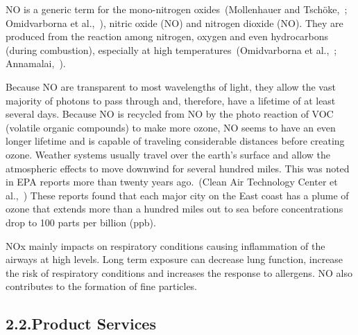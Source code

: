 \documentclass[9pt]{article}
\begin{document}
\noindent{}NO is a generic term for the mono-nitrogen oxides~(Mollenhauer and Tschöke,~; Omidvarborna et al.,~), nitric oxide (NO) and nitrogen dioxide (NO).
They are produced from the reaction among nitrogen, oxygen and even hydrocarbons (during combustion), especially at high temperatures~(Omidvarborna et al.,~; Annamalai,~).%

Because NO are transparent to most wavelengths of light, they allow the vast majority of photons to pass through and, therefore, have a lifetime of at least several days. 
Because NO is  recycled from NO by the photo reaction of VOC (volatile organic compounds) to make more ozone, NO seems to have an even longer lifetime and is capable of traveling considerable distances before creating ozone.  Weather systems usually travel over the earth’s surface and allow the atmospheric effects to move downwind for several hundred miles.
This was noted in EPA reports more than twenty years ago.~(Clean Air Technology Center et al.,~)
These reports found that each major city on the East coast has a plume of ozone that extends more than a hundred miles out to sea before concentrations drop to 100 parts per billion (ppb).%

NOx mainly impacts on respiratory conditions causing inflammation of the airways at high levels. Long term exposure can decrease lung function, increase the risk of respiratory conditions and increases the response to allergens. 
NO also contributes to the formation of fine particles.%

\subsection{2.2.\hspace*{0.5em}Product Services}\label{sec-product-services}%
\end{document}
